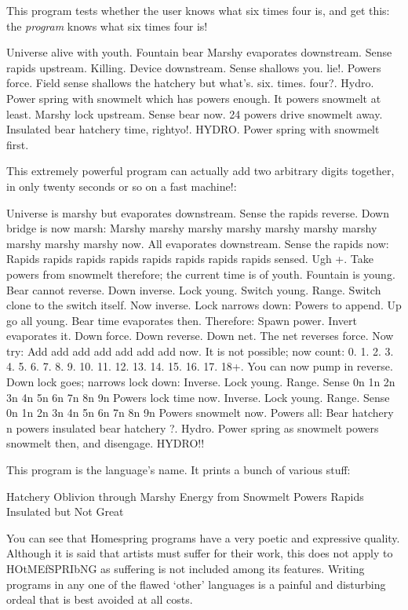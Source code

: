 \documentclass[10pt]{article}
\begin{document}
This program tests whether the user knows what six times four is, and get this: the \textit{program} knows what six times four is!

\begin{verbatim*}
Universe alive with youth. Fountain bear Marshy
evaporates downstream. Sense rapids
upstream. Killing. Device downstream. Sense shallows you. lie!.
 Powers   force. Field sense shallows the hatchery but
what's. six. times. four?. 
  Hydro. Power spring  with snowmelt which has
       powers enough.
        It powers    snowmelt at least.
       Marshy lock upstream. Sense bear now.
24  powers drive   snowmelt away.
   Insulated bear hatchery time, rightyo!.
 HYDRO. Power spring  with snowmelt first.
\end{verbatim*}

\newpage
This extremely powerful program can actually add two arbitrary digits together, in only twenty seconds or so on a fast machine!:

\begin{verbatim*}
Universe is marshy but evaporates downstream. Sense the rapids reverse. Down
bridge is now marsh:
Marshy marshy marshy marshy marshy marshy marshy marshy marshy marshy now.
All evaporates downstream. Sense
the rapids now:
Rapids rapids rapids rapids rapids rapids rapids rapids sensed.
Ugh +. 
 Take powers from                  snowmelt  therefore;
                 the   current time is of youth. Fountain is young. Bear cannot
reverse. Down inverse. Lock young. Switch young. Range. Switch clone to the
switch itself. Now inverse. Lock narrows down:
    Powers
       to   append. Up go all young. Bear time evaporates
then. Therefore:
Spawn power. Invert evaporates it. Down force. Down reverse. Down net. The
 net reverses force.
Now try:
Add add add add add add add now.
It is not possible; now count:
0.
1.
2.
3.
4.
5.
6.
7.
8.
9.
10.
11.
12.
13.
14.
15.
16.
17.
18+.
                                    You   can   now   pump
in reverse. Down lock goes; narrows lock down:
Inverse. Lock young. Range. Sense 0n 1n 2n 3n 4n 5n 6n 7n 8n 9n
          Powers         lock time now.
Inverse. Lock young. Range. Sense 0n 1n 2n 3n 4n 5n 6n 7n 8n 9n
          Powers            snowmelt   now.
    Powers
      all:
Bear hatchery n
 powers
               insulated bear hatchery ?. 
 Hydro. Power spring as
 snowmelt         powers   snowmelt  then, and disengage.
HYDRO!!
\end{verbatim*}

\newpage
This program is the language's name. It prints a bunch of various stuff:

\begin{verbatim*}
Hatchery
Oblivion through
Marshy
Energy from
Snowmelt
Powers
Rapids
Insulated but
Not
Great
\end{verbatim*}

You can see that Homespring programs have a very poetic and expressive quality. Although it is said that artists must suffer for their work, this does not apply to HOtMEfSPRIbNG as suffering is not included among its features. Writing programs in any one of the flawed `other' languages is a painful and disturbing ordeal that is best avoided at all costs. 
\end{document}
